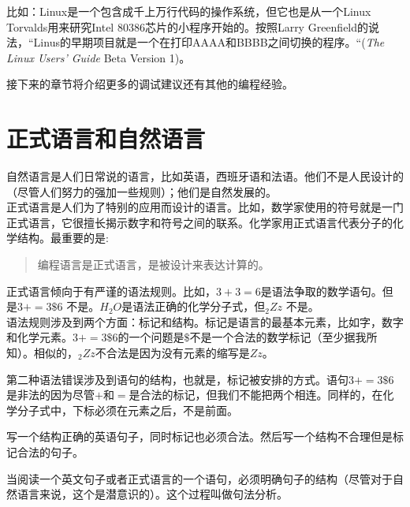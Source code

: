 比如：Linux是一个包含成千上万行代码的操作系统，但它也是从一个Linux Torvalds用来研究Intel 80386芯片的小程序开始的。按照Larry Greenfield的说法，“Linus的早期项目就是一个在打印AAAA和BBBB之间切换的程序。“({\em The Linux Users' Guide} Beta Version 1)。


接下来的章节将介绍更多的调试建议还有其他的编程经验。

\section{正式语言和自然语言}

自然语言是人们日常说的语言，比如英语，西班牙语和法语。他们不是人民设计的（尽管人们努力的强加一些规则）；他们是自然发展的。\\

正式语言是人们为了特别的应用而设计的语言。比如，数学家使用的符号就是一门正式语言，它很擅长揭示数字和符号之间的联系。化学家用正式语言代表分子的化学结构。最重要的是:

\begin{quote}
{编程语言是正式语言，是被设计来表达计算的。}
\end{quote}

正式语言倾向于有严谨的语法规则。比如，$3 + 3 = 6$是语法争取的数学语句。但是$3 += 3 \mbox{\$} 6$ 不是。$H_2O$是语法正确的化学分子式，但$_2Zz$ 不是。\\

语法规则涉及到两个方面：标记和结构。标记是语言的最基本元素，比如字，数字和化学元素。$3 += 3 \mbox{\$} 6$的一个问题是$\$$不是一个合法的数学标记（至少据我所知）。相似的，$_2Zz$不合法是因为没有元素的缩写是$Zz$。


第二种语法错误涉及到语句的结构，也就是，标记被安排的方式。语句$3 + = 3 \mbox{\$} 6$是非法的因为尽管$+$和$=$是合法的标记，但我们不能把两个相连。同样的，在化学分子式中，下标必须在元素之后，不是前面。

\begin{ex}
写一个结构正确的英语句子，同时标记也必须合法。然后写一个结构不合理但是标记合法的句子。
\end{ex}

当阅读一个英文句子或者正式语言的一个语句，必须明确句子的结构（尽管对于自然语言来说，这个是潜意识的）。这个过程叫做句法分析。

